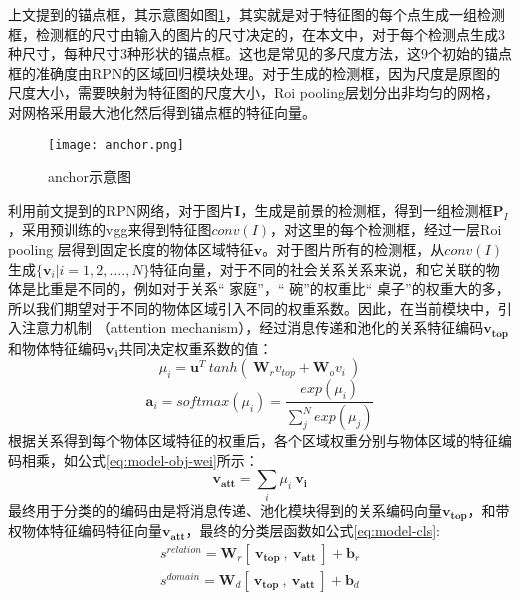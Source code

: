 上文提到的锚点框，其示意图如图\ref{fig:anchor}，其实就是对于特征图的每个点生成一组检测框，检测框的尺寸由输入的图片的尺寸决定的，在本文中，对于每个检测点生成3种尺寸，每种尺寸3种形状的锚点框。这也是常见的多尺度方法，这9个初始的锚点框的准确度由RPN的区域回归模块处理。对于生成的检测框，因为尺度是原图的尺度大小，需要映射为特征图的尺度大小，Roi pooling层划分出非均匀的网格，对网格采用最大池化然后得到锚点框的特征向量。
\begin{figure}[htpb]
	\centering
	\texttt{[image: anchor.png]}
    \caption{anchor示意图}
	\vspace*{-3.5mm}
	\label{fig:anchor}
\end{figure}

利用前文提到的RPN网络，对于图片$\bm{I}$，生成是前景的检测框，得到一组检测框$\bm{P}_{I}$，采用预训练的vgg来得到特征图$conv(I)$，对这里的每个检测框，经过一层Roi pooling 层得到固定长度的物体区域特征$\mathbf{v}$。对于图片所有的检测框，从$conv(I)$生成$\{ \mathbf{v}_{i}|i=1,2,....,N\}$特征向量，对于不同的社会关系关系来说，和它关联的物体是比重是不同的，例如对于关系`` 家庭''，`` 碗''的权重比`` 桌子''的权重大的多，所以我们期望对于不同的物体区域引入不同的权重系数。因此，在当前模块中，引入注意力机制
（attention mechanism），经过消息传递和池化的关系特征编码$\mathbf{v_{top}}$和物体特征编码$\mathbf{v_{i}}$共同决定权重系数的值：
\begin{equation}
    \mu_{i} = \mathbf{u}^{T}~tanh(~\mathbf{W}_{r}v_{top}+\mathbf{W}_{o}v_{i}~)
\end{equation}
\begin{equation}
    \mathbf{a}_{i} = softmax(\mu_i) = \frac{exp(\mu_{i})}{\sum_{j}^{N}exp(\mu_{j})}
\end{equation}
根据关系得到每个物体区域特征的权重后，各个区域权重分别与物体区域的特征编码相乘，如公式\ref{eq:model-obj-wei}所示：
\begin{equation}
    \label{eq:model-obj-wei}
    \mathbf{v_{att}} = \sum_{i}\mu_{i}~\mathbf{v_{i}}
\end{equation}
最终用于分类的的编码由是将消息传递、池化模块得到的关系编码向量$\mathbf{v_{top}}$，和带权物体特征编码特征向量$\mathbf{v_{att}}$，最终的分类层函数如公式\ref{eq:model-cls}:
\begin{equation}
    \label{eq:model-cls}
    \begin{split}
    s^{relation} = \mathbf{W}_{r}[~\mathbf{v_{top}}~,~\mathbf{v_{att}}~] + \mathbf{b}_r \\
    s^{domain} = \mathbf{W}_{d}[~\mathbf{v_{top}}~,~\mathbf{v_{att}}~] + \mathbf{b}_d
    \end{split}
\end{equation}


